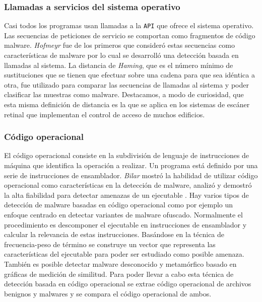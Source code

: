 \documentclass[12pt]{article}
\begin{document}
            \subsubsection{Llamadas a servicios del sistema operativo}
                Casi todos los programas usan llamadas a la \texttt{API} que ofrece el sistema operativo. Las secuencias de peticiones de servicio se comportan como fragmentos de código malware. \textit{Hofmeyr} fue de los primeros que consideró estas secuencias como características de malware \cite{bib:malware_calls} por lo cual se desarrolló una detección basada en llamadas al sistema. La distancia de \textit{Haming}, que es el número mínimo de sustituciones que se tienen que efectuar sobre una cadena para que sea idéntica a otra, fue utilizado para comparar las secuencias de llamadas al sistema y poder clasificar las muestras como malware. Destacamos, a modo de curiosidad, que esta misma definición de distancia es la que se aplica en los sistemas de escáner retinal que implementan el control de acceso de muchos edificios.

            \subsubsection{Código operacional}
                El código operacional consiste en la subdivisión de lenguaje de instrucciones de máquina que identifica la operación a realizar. Un programa está definido por una serie de instrucciones de ensamblador. \textit{Bilar} mostró la habilidad de utilizar código operacional como características en la detección de malware, analizó y demostró la alta fiabilidad para detectar amenazas de un ejecutable \cite{bib:malware_asm}. Hay varios tipos de detección de malware basadas en código operacional como por ejemplo un enfoque centrado en detectar variantes de malware ofuscado. Normalmente el procedimiento es descomponer el ejecutable en instrucciones de ensamblador y calcular la relevancia de estas instrucciones. Basándose en la técnica de frecuencia-peso de término se construye un vector que representa las características del ejecutable para poder ser estudiado como posible amenaza. También es posible detectar malware desconocido  y metamórfico basado en gráficas de medición de similitud. Para poder llevar a cabo esta técnica de detección basada en código operacional se extrae código operacional de archivos benignos y malwares y se compara el código operacional de ambos.
\end{document}

